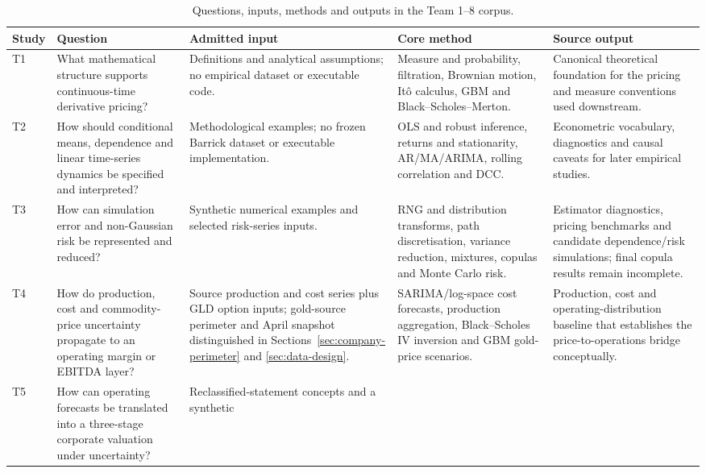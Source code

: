 \begin{table}[H]
\centering
\caption{Questions, inputs, methods and outputs in the Team 1--8 corpus.}
\label{tab:team-question-model-output}
\scriptsize
\setlength{\tabcolsep}{3pt}
\renewcommand{\arraystretch}{1.10}
\begin{tabularx}{\textwidth}{@{}p{0.85cm}p{2.32cm}X X X@{}}
\toprule
\textbf{Study} & \textbf{Question} & \textbf{Admitted input} &
\textbf{Core method} & \textbf{Source output} \\
\midrule
T1 & What mathematical structure supports continuous-time derivative pricing?
& Definitions and analytical assumptions; no empirical dataset or executable
code. & Measure and probability, filtration, Brownian motion, It\^o calculus,
GBM and Black--Scholes--Merton. & Canonical theoretical foundation for the
pricing and measure conventions used downstream. \\
T2 & How should conditional means, dependence and linear time-series dynamics
be specified and interpreted? & Methodological examples; no frozen Barrick
dataset or executable implementation. & OLS and robust inference, returns and
stationarity, AR/MA/ARIMA, rolling correlation and DCC. & Econometric vocabulary,
diagnostics and causal caveats for later empirical studies. \\
T3 & How can simulation error and non-Gaussian risk be represented and reduced?
& Synthetic numerical examples and selected risk-series inputs. & RNG and
distribution transforms, path discretisation, variance reduction, mixtures,
copulas and Monte Carlo risk. & Estimator diagnostics, pricing benchmarks and
candidate dependence/risk simulations; final copula results remain incomplete. \\
T4 & How do production, cost and commodity-price uncertainty propagate to an
operating margin or EBITDA layer? & Source production and cost series plus GLD
option inputs; gold-source perimeter and April snapshot distinguished in
Sections~\ref{sec:company-perimeter} and \ref{sec:data-design}. & SARIMA/log-space
cost forecasts, production aggregation, Black--Scholes IV inversion and GBM
gold-price scenarios. & Production, cost and operating-distribution baseline
that establishes the price-to-operations bridge conceptually. \\
T5 & How can operating forecasts be translated into a three-stage corporate
valuation under uncertainty? & Reclassified-statement concepts and a synthetic

\end{tabularx}
\end{table}
